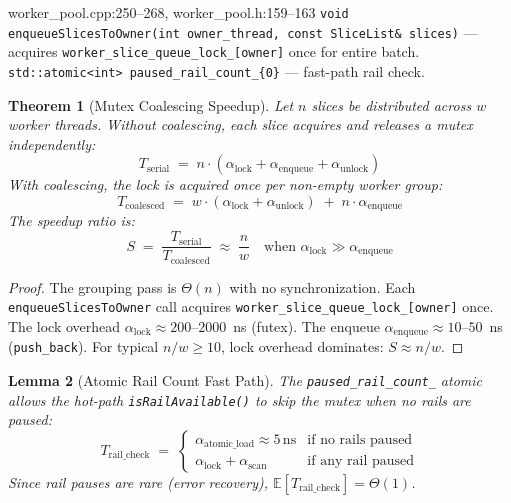 \documentclass[11pt,a4paper,twoside]{article}
\theoremstyle{plain}
\newtheorem{theorem}{Theorem}[section]
\newtheorem{lemma}[theorem]{Lemma}
\theoremstyle{definition}
\theoremstyle{remark}
\newcommand{\Expect}{\mathbb{E}}
\begin{document}
\begin{codeline}{worker\_pool.cpp:250--268, worker\_pool.h:159--163}
\texttt{void enqueueSlicesToOwner(int owner\_thread, const SliceList\& slices)} ---
acquires \texttt{worker\_slice\_queue\_lock\_[owner]} once for entire batch.\\
\texttt{std::atomic<int> paused\_rail\_count\_\{0\}} --- fast-path rail check.
\end{codeline}

\begin{theorem}[Mutex Coalescing Speedup]
\label{thm:mutex-coalesce}
Let $n$ slices be distributed across $w$ worker threads.  Without coalescing,
each slice acquires and releases a mutex independently:
\begin{equation}
  T_{\text{serial}} \;=\; n \cdot (\alpha_{\text{lock}} + \alpha_{\text{enqueue}} +
  \alpha_{\text{unlock}})
\end{equation}
With coalescing, the lock is acquired once per non-empty worker group:
\begin{equation}
  T_{\text{coalesced}} \;=\; w \cdot (\alpha_{\text{lock}} + \alpha_{\text{unlock}})
  \;+\; n \cdot \alpha_{\text{enqueue}}
\end{equation}
The speedup ratio is:
\begin{equation}
  S \;=\; \frac{T_{\text{serial}}}{T_{\text{coalesced}}}
  \;\approx\; \frac{n}{w}
  \quad\text{when } \alpha_{\text{lock}} \gg \alpha_{\text{enqueue}}
  \label{eq:mutex-speedup}
\end{equation}
\end{theorem}

\begin{proof}
The grouping pass is $\Theta(n)$ with no synchronization.
Each \texttt{enqueueSlicesToOwner} call acquires \texttt{worker\_slice\_queue\_lock\_[owner]}
once.  The lock overhead $\alpha_{\text{lock}} \approx 200$--$2000$~ns (futex).
The enqueue $\alpha_{\text{enqueue}} \approx 10$--$50$~ns (\texttt{push\_back}).
For typical $n/w \geq 10$, lock overhead dominates: $S \approx n/w$.
\end{proof}

\begin{lemma}[Atomic Rail Count Fast Path]
\label{lem:rail-count}
The \texttt{paused\_rail\_count\_} atomic allows the hot-path \texttt{isRailAvailable()}
to skip the mutex when no rails are paused:
\begin{equation}
  T_{\text{rail\_check}} \;=\;
  \begin{cases}
    \alpha_{\text{atomic\_load}} \approx 5\,\text{ns} & \text{if no rails paused}\\
    \alpha_{\text{lock}} + \alpha_{\text{scan}} & \text{if any rail paused}
  \end{cases}
\end{equation}
Since rail pauses are rare (error recovery), $\Expect[T_{\text{rail\_check}}] = \Theta(1)$.
\end{lemma}
\end{document}

